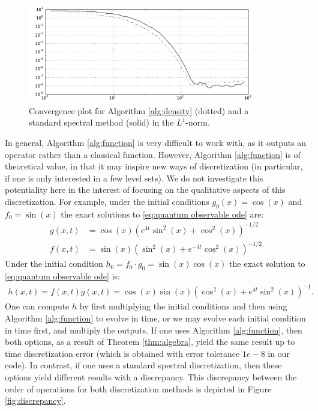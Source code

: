 \documentclass[final,leqno]{siamart}
\begin{document}
\begin{figure}[h!]
	\hspace*{-1.2cm}
	\centering
	\includegraphics[width=0.9\textwidth]{./images/convergence_plot.pdf}
	\caption{Convergence plot for Algorithm \ref{alg:density} (dotted) and a standard spectral method (solid) in the $L^{1}$-norm.}
	\label{fig:convergence}
\end{figure}

In general, Algorithm \ref{alg:function} is very difficult to work with, as it outputs an operator rather than a classical function.
However, Algorithm \ref{alg:function} is of theoretical value, in that it may inspire new ways of discretization (in particular, if one is only interested in a few level sets).
We do not investigate this potentiality here in the interest of focusing on the qualitative aspects of this discretization.
For example, under the initial conditions $g_{0}(x) = \cos(x)$ and $f_{0} = \sin(x)$ the exact solutions to \eqref{eq:quantum observable ode} are:
\begin{align*}
	g(x,t) &= \cos(x) \left( e^{4t} \sin^{2}(x) + \cos^{2}(x) \right)^{-1/2}\\
	f(x,t) &= \sin(x) \left( \sin^{2}(x) + e^{-4t} \cos^{2}(x) \right)^{-1/2}
\end{align*}
Under the initial condition $h_{0} = f_{0} \cdot g_{0}  = \sin(x) \cos(x)$ the exact solution to \eqref{eq:quantum observable ode} is:
\begin{align*}
	h(x,t) = f(x,t) g(x,t) = \cos(x) \sin(x) \left( \cos^{2}(x) + e^{4t} \sin^{2}(x) \right)^{-1}.
\end{align*}
One can compute $h$ by first multiplying the initial conditions and then using Algorithm \ref{alg:function} to evolve in time, or we may evolve each initial condition in time first, and multiply the outputs.
If one uses Algorithm \ref{alg:function}, then both options, as a result of Theorem \ref{thm:algebra}, yield the same result up to time discretization error (which is obtained with error tolerance $1e-8$ in our code).
In contrast, if one uses a standard spectral discretization, then these options yield different results with a discrepancy.
This discrepancy between the order of operations for both discretization methods is depicted in Figure \ref{fig:discrepancy}.
\end{document}
